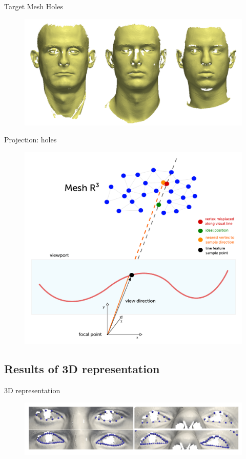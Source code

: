 \documentclass[xcolor=x11names,compress]{beamer}
\begin{document}
    \begin{frame}{Target Mesh Holes}
        \begin{figure}
            \centering
            \includegraphics[width=.8\textwidth]{../resources/img/holes.pdf}
        \end{figure}
    \end{frame}

    \begin{frame}{Projection: holes}
        \begin{figure}
            \centering
            \includegraphics[width=.8\textwidth]{../resources/figures/projection_holes.pdf}
        \end{figure}
    \end{frame}


    \subsection{Results of 3D representation}
    \begin{frame}{3D representation}
         \begin{figure}
            \centering
            \includegraphics[width=\textwidth]{../resources/img/linefeatures_eyes.pdf}
        \end{figure}
    \end{frame}
\end{document}
